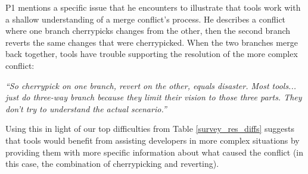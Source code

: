  P1 mentions a specific issue that he encounters to illustrate that tools work with a shallow understanding of a merge conflict's process. He describes a conflict where one branch cherrypicks changes from the other, then the second branch reverts the same changes that were cherrypicked. When the two branches merge back together, tools have trouble supporting the resolution of the more complex conflict:
 \begin{displayquote}
 \textit{``So cherrypick on one branch, revert on the other, equals disaster. Most tools... just do three-way branch because they limit their vision to those three parts. They don't try to understand the actual scenario.''}
 \end{displayquote}
 Using this in light of our top difficulties from Table \ref{survey_res_diffs} suggests that tools would benefit from assisting developers in more complex situations by providing them with more specific information about what caused the conflict (in this case, the combination of cherrypicking and reverting).
